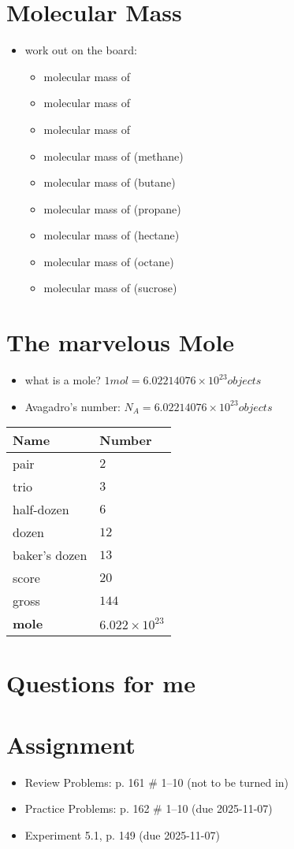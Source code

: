 \documentclass[10pt, oneside]{article}   	%
\begin{document}
\section*{Molecular Mass}
\begin{itemize}
\item work out on the board:
\begin{itemize}
\item  molecular mass of 
\item  molecular mass of 
\item  molecular mass of 
\item  molecular mass of  (methane)
\item  molecular mass of  (butane)
\item  molecular mass of  (propane)
\item  molecular mass of  (hectane)
\item  molecular mass of  (octane)
\item  molecular mass of  (sucrose)
\end{itemize}
\end{itemize}

\section*{The marvelous Mole}
\begin{itemize}
\item what is a mole? $1 mol = 6.02214076 \times 10^{23} objects$
\item Avagadro's number: $ N_A = 6.02214076 \times 10^{23} objects$
\end{itemize}

\begin{table}[h]
\centering
\begin{tabular}[b]{l|l}
\hline
Name & Number \\
\hline
pair  & $2$ \\
trio  & $3$ \\ 
half-dozen & $6$ \\
dozen & $12$ \\
baker's dozen & $13$ \\
score & $20$ \\
gross & $144$ \\
\textbf{mole}   & \textbf{$6.022 \times 10^{23}$}\\
\end{tabular}
\end{table}

\section*{Questions for me}

\section*{Assignment}
\begin{itemize}
\item Review Problems: p. 161 \# 1--10 (not to be turned in)
\item Practice Problems: p. 162 \# 1--10 (due 2025-11-07)
\item Experiment 5.1, p. 149 (due 2025-11-07)
\end{itemize}
\end{document}

